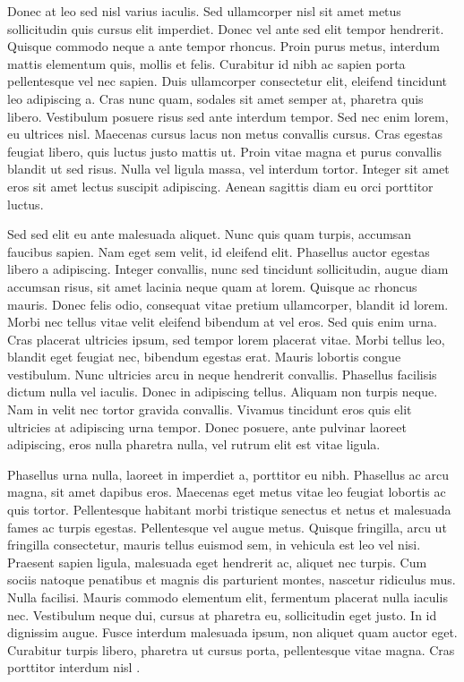 \documentclass[msc, classic, a4paper]{ufbathesis}
\begin{document}
Donec at leo sed nisl varius iaculis. Sed ullamcorper nisl sit amet metus sollicitudin quis cursus elit imperdiet. Donec vel ante sed elit tempor hendrerit. Quisque commodo neque a ante tempor rhoncus. Proin purus metus, interdum mattis elementum quis, mollis et felis. Curabitur id nibh ac sapien porta pellentesque vel nec sapien. Duis ullamcorper consectetur elit, eleifend tincidunt leo adipiscing a. Cras nunc quam, sodales sit amet semper at, pharetra quis libero. Vestibulum posuere risus sed ante interdum tempor. Sed nec enim lorem, eu ultrices nisl. Maecenas cursus lacus non metus convallis cursus. Cras egestas feugiat libero, quis luctus justo mattis ut. Proin vitae magna et purus convallis blandit ut sed risus. Nulla vel ligula massa, vel interdum tortor. Integer sit amet eros sit amet lectus suscipit adipiscing. Aenean sagittis diam eu orci porttitor luctus.

Sed sed elit eu ante malesuada aliquet. Nunc quis quam turpis, accumsan faucibus sapien. Nam eget sem velit, id eleifend elit. Phasellus auctor egestas libero a adipiscing. Integer convallis, nunc sed tincidunt sollicitudin, augue diam accumsan risus, sit amet lacinia neque quam at lorem. Quisque ac rhoncus mauris. Donec felis odio, consequat vitae pretium ullamcorper, blandit id lorem. Morbi nec tellus vitae velit eleifend bibendum at vel eros. Sed quis enim urna. Cras placerat ultricies ipsum, sed tempor lorem placerat vitae. Morbi tellus leo, blandit eget feugiat nec, bibendum egestas erat. Mauris lobortis congue vestibulum. Nunc ultricies arcu in neque hendrerit convallis. Phasellus facilisis dictum nulla vel iaculis. Donec in adipiscing tellus. Aliquam non turpis neque. Nam in velit nec tortor gravida convallis. Vivamus tincidunt eros quis elit ultricies at adipiscing urna tempor. Donec posuere, ante pulvinar laoreet adipiscing, eros nulla pharetra nulla, vel rutrum elit est vitae ligula.

Phasellus urna nulla, laoreet in imperdiet a, porttitor eu nibh. Phasellus ac arcu magna, sit amet dapibus eros. Maecenas eget metus vitae leo feugiat lobortis ac quis tortor. Pellentesque habitant morbi tristique senectus et netus et malesuada fames ac turpis egestas. Pellentesque vel augue metus. Quisque fringilla, arcu ut fringilla consectetur, mauris tellus euismod sem, in vehicula est leo vel nisi. Praesent sapien ligula, malesuada eget hendrerit ac, aliquet nec turpis. Cum sociis natoque penatibus et magnis dis parturient montes, nascetur ridiculus mus. Nulla facilisi. Mauris commodo elementum elit, fermentum placerat nulla iaculis nec. Vestibulum neque dui, cursus at pharetra eu, sollicitudin eget justo. In id dignissim augue. Fusce interdum malesuada ipsum, non aliquet quam auctor eget. Curabitur turpis libero, pharetra ut cursus porta, pellentesque vitae magna. Cras porttitor interdum nisl \cite{raymond1999}.
\end{document}
